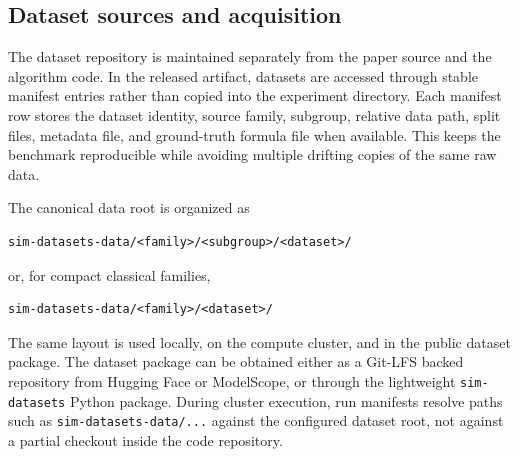 \subsection{Dataset sources and acquisition}

The dataset repository is maintained separately from the paper source and the algorithm code. In the released artifact, datasets are accessed through stable manifest entries rather than copied into the experiment directory. Each manifest row stores the dataset identity, source family, subgroup, relative data path, split files, metadata file, and ground-truth formula file when available. This keeps the benchmark reproducible while avoiding multiple drifting copies of the same raw data.

The canonical data root is organized as
\begin{verbatim}
sim-datasets-data/<family>/<subgroup>/<dataset>/
\end{verbatim}
or, for compact classical families,
\begin{verbatim}
sim-datasets-data/<family>/<dataset>/
\end{verbatim}
The same layout is used locally, on the compute cluster, and in the public dataset package. The dataset package can be obtained either as a Git-LFS backed repository from Hugging Face or ModelScope, or through the lightweight \texttt{sim-datasets} Python package. During cluster execution, run manifests resolve paths such as \texttt{sim-datasets-data/...} against the configured dataset root, not against a partial checkout inside the code repository.

